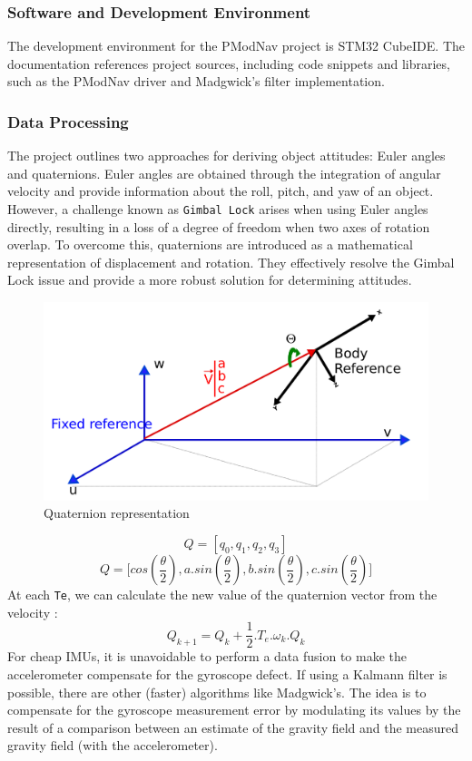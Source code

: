 \subsubsection{Software and Development Environment}
The development environment for the PModNav project is STM32 CubeIDE. The documentation references project sources, including code snippets and libraries, such as the PModNav driver and Madgwick's filter implementation. 

\subsubsection{Data Processing}
The project outlines two approaches for deriving object attitudes: Euler angles and quaternions. Euler angles are obtained through the integration of angular velocity and provide information about the roll, pitch, and yaw of an object. However, a challenge known as \texttt{Gimbal Lock}\cite{gimbal_lock} arises when using Euler angles directly, resulting in a loss of a degree of freedom when two axes of rotation overlap. To overcome this, quaternions are introduced as a mathematical representation of displacement and rotation. They effectively resolve the Gimbal Lock issue and provide a more robust solution for determining attitudes.
\begin{figure}[H]
    \centering
    \includegraphics[width=0.65\linewidth]{./projects/pmodnav/quaternions.png}
    \caption{Quaternion representation}
\end{figure}
$$ Q = [q_0, q_1, q_2, q_3 ] $$
$$ Q = \big[cos(\frac{\theta}{2}), a.sin(\frac{\theta}{2}), b.sin(\frac{\theta}{2}), c.sin(\frac{\theta}{2})\big] $$
At each \texttt{Te}, we can calculate the new value of the quaternion vector from the velocity :
$$ Q_{k+1} = Q_k+\frac{1}{2}.T_e.\omega_k.Q_k $$
For cheap IMUs, it is unavoidable to perform a data fusion to make the accelerometer compensate for the gyroscope defect. If using a Kalmann filter is possible, there are other (faster) algorithms like Madgwick's. The idea is to compensate for the gyroscope measurement error by modulating its values by the result of a comparison between an estimate of the gravity field and the measured gravity field (with the accelerometer).
\hfill \break
{}

